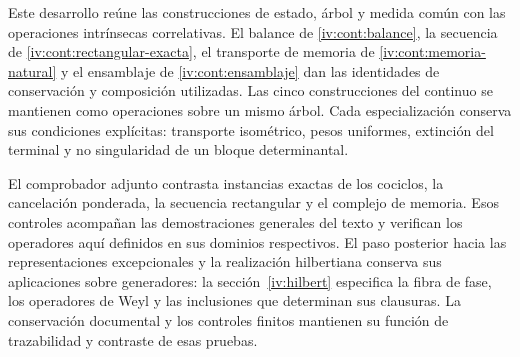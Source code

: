 Este desarrollo reúne las construcciones de estado, árbol y medida
común con las operaciones intrínsecas correlativas. El balance de
\ref{iv:cont:balance}, la secuencia de \ref{iv:cont:rectangular-exacta},
el transporte de memoria de \ref{iv:cont:memoria-natural} y el
ensamblaje de \ref{iv:cont:ensamblaje} dan las identidades de conservación
y composición utilizadas. Las cinco construcciones del continuo se
mantienen como operaciones sobre un mismo árbol. Cada especialización
conserva sus condiciones explícitas: transporte isométrico, pesos uniformes,
extinción del terminal y no singularidad de un bloque determinantal.

El comprobador adjunto contrasta instancias exactas de los cociclos, la cancelación ponderada, la secuencia rectangular y el complejo de memoria. Esos controles acompañan las demostraciones generales del texto y verifican los operadores aquí definidos en sus dominios respectivos. El paso posterior hacia las representaciones excepcionales y la realización hilbertiana conserva sus aplicaciones sobre generadores: la sección~\ref{iv:hilbert} especifica la fibra de fase, los operadores de Weyl y las inclusiones que determinan sus clausuras. La conservación documental y los controles finitos mantienen su función de trazabilidad y contraste de esas pruebas.
